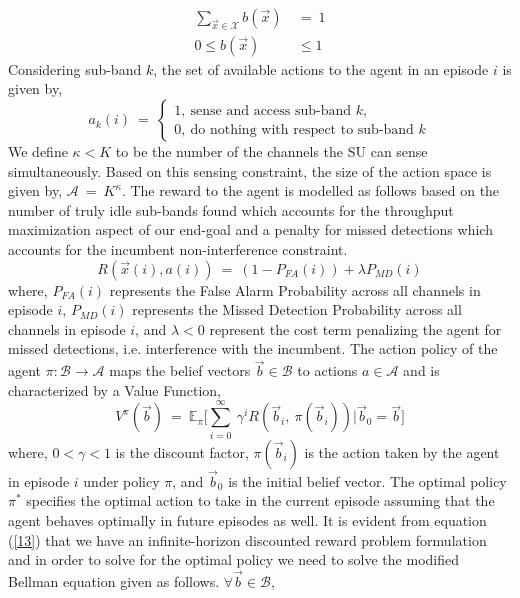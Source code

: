 \documentclass[12pt, draftcls, onecolumn]{IEEEtran}
\begin{document}
\begin{equation}\label{10}
    \begin{aligned}
        \sum_{\vec{x} \in \mathcal{X}} b(\vec{x})\ &=\ 1 \\
        0 \leq b(\vec{x}) &\leq 1
    \end{aligned}
\end{equation}
Considering sub-band $k$, the set of available actions to the agent in an episode $i$ is given by,
\begin{equation}\label{11}
    a_k(i)\ =\ 
    \begin{cases}
        1,\ \text{sense and access sub-band $k$},\\
        0,\ \text{do nothing with respect to sub-band $k$}
    \end{cases}
\end{equation}
We define $\kappa < K$ to be the number of the channels the SU can sense simultaneously. Based on this sensing constraint, the size of the action space is given by, $\mathcal{A}\ =\ K^{\kappa}$. The reward to the agent is modelled as follows based on the number of truly idle sub-bands found which accounts for the throughput maximization aspect of our end-goal and a penalty for missed detections which accounts for the incumbent non-interference constraint.
\begin{equation}\label{12}
    R(\vec{x}(i),a(i))\ =\ (1 - P_{FA}(i)) + \lambda P_{MD}(i)
\end{equation}
where, $P_{FA}(i)$ represents the False Alarm Probability across all channels in episode $i$, $P_{MD}(i)$ represents the Missed Detection Probability across all channels in episode $i$, and $\lambda < 0$ represent the cost term penalizing the agent for missed detections, i.e. interference with the incumbent. The action policy of the agent $\pi: \mathcal{B} \rightarrow \mathcal{A}$ maps the belief vectors $\vec{b} \in \mathcal{B}$ to actions $a \in \mathcal{A}$ and is characterized by a Value Function,
\begin{equation}\label{13}
    V^{\pi}(\vec{b})\ =\ \mathbb{E}_{\pi}\Big[\sum_{i=0}^{\infty}\ \gamma^i R(\vec{b}_i,\ \pi(\vec{b}_i))|\vec{b}_0=\vec{b}\Big]
\end{equation}
where, $0 < \gamma < 1$ is the discount factor, $\pi(\vec{b}_i)$ is the action taken by the agent in episode $i$ under policy $\pi$, and $\vec{b}_0$ is the initial belief vector. The optimal policy $\pi^*$ specifies the optimal action to take in the current episode assuming that the agent behaves optimally in future episodes as well. It is evident from equation (\ref{13}) that we have an infinite-horizon discounted reward problem formulation and in order to solve for the optimal policy we need to solve the modified Bellman equation given as follows. $\forall \vec{b} \in \mathcal{B}$,
\end{document}
